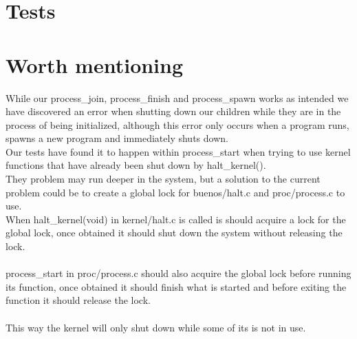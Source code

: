 \documentclass[a4paper,12pt,danish]{report}
\begin{document}
\section{Tests}
\section{Worth mentioning}
While our process\_join, process\_finish and process\_spawn works as intended we have discovered an error when shutting down our children while they are in the process of being initialized, although this error only occurs when a program runs, spawns a new program and immediately shuts down.
\\
Our tests have found it to happen within process\_start when trying to use kernel functions that have already been shut down by halt\_kernel().
\\
They problem may run deeper in the system, but a solution to the current problem could be to create a global lock for buenos/halt.c and proc/process.c to use.
\\
When halt\_kernel(void) in kernel/halt.c is called is should acquire a lock for the global lock, once obtained it should shut down the system without releasing the lock.
\\
\\
process\_start in proc/process.c should also acquire the global lock before running its function, once obtained it should finish what is started and before exiting the function it should release the lock.
\\
\\
This way the kernel will only shut down while some of its  is not in use.
\end{document}
